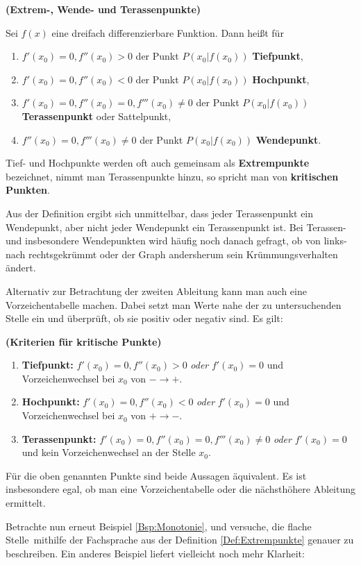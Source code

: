 \documentclass[ngerman, 12pt]{nssheetxea}
\begin{document}

\begin{definition} \textbf{(Extrem-, Wende- und Terassenpunkte)} \par
Sei $f(x)$ eine dreifach differenzierbare Funktion. Dann heißt für
\begin{enumerate}
\item $f'(x_0)=0, f''(x_0)> 0$ der Punkt $P(x_0|f(x_0))$ \textbf{Tiefpunkt}, 
\item $f'(x_0)=0, f''(x_0)< 0$ der Punkt $P(x_0|f(x_0))$ \textbf{Hochpunkt}, 
\item $f'(x_0)=0, f''(x_0)= 0, f'''(x_0)\neq 0$ der Punkt $P(x_0|f(x_0))$ \textbf{Terassenpunkt} oder Sattelpunkt,  
\item $f''(x_0)= 0, f'''(x_0)\neq 0$ der Punkt $P(x_0|f(x_0))$ \textbf{Wendepunkt}. 
\end{enumerate}
Tief- und Hochpunkte werden oft auch gemeinsam als \textbf{Extrempunkte} bezeichnet, nimmt man Terassenpunkte hinzu, so spricht man von \textbf{kritischen Punkten}.
\label{Def:Extrempunkte}
\end{definition}
Aus der Definition ergibt sich unmittelbar, dass jeder Terassenpunkt ein Wendepunkt, aber nicht jeder Wendepunkt ein Terassenpunkt ist. Bei Terassen- und insbesondere Wendepunkten wird häufig noch danach gefragt, ob von links- nach rechtsgekrümmt oder der Graph andersherum sein Krümmungsverhalten ändert. \par
Alternativ zur Betrachtung der zweiten Ableitung kann man auch eine Vorzeichentabelle machen. Dabei setzt man Werte nahe der zu untersuchenden Stelle ein und überprüft, ob sie positiv oder negativ sind. Es gilt:
\begin{theorem} \textbf{(Kriterien für kritische Punkte)}
\begin{enumerate}
\item \textbf{Tiefpunkt:} $f'(x_0)=0, f''(x_0)>0$ \textit{oder} $f'(x_0)=0$ und Vorzeichenwechsel bei $x_0$ von $- \to +$.
\item \textbf{Hochpunkt:} $f'(x_0)=0, f''(x_0)<0$ \textit{oder} $f'(x_0)=0$ und Vorzeichenwechsel bei $x_0$ von $+ \to -$.
\item \textbf{Terassenpunkt:} $f'(x_0)=0, f''(x_0)=0, f'''(x_0)\neq 0$ \textit{oder} $f'(x_0)=0$ und kein Vorzeichenwechsel an der Stelle $x_0$.
\end{enumerate}
Für die oben genannten Punkte sind beide Aussagen äquivalent. Es ist insbesondere egal, ob man eine Vorzeichentabelle oder die nächsthöhere Ableitung ermittelt.

\end{theorem}
Betrachte nun erneut Beispiel \ref{Bsp:Monotonie}, und versuche, die \glqq flache Stelle\grqq \ mithilfe der Fachsprache aus der Definition \ref{Def:Extrempunkte} genauer zu beschreiben. Ein anderes Beispiel liefert vielleicht noch mehr Klarheit:
\end{document}
